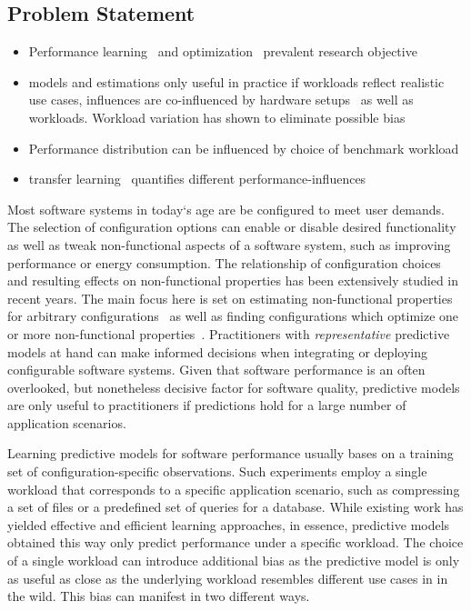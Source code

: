 \documentclass[conference]{IEEEtran}
\begin{document}
\subsection{Problem Statement}
\begin{itemize}
	\item Performance learning~\cite{siegmund_performance-influence_2015,haDeepPerf2019,guo__2013,guo_2018_data,sarkarCostEfficientSamplingPerformance,shu_adversarial_2020} and optimization~\cite{nairUsingBadLearners2017,nairFlash18,ohFindingNearoptimalConfigurations2017} prevalent research objective
	\item models and estimations only useful in practice if workloads reflect realistic use cases, influences are co-influenced by hardware setups~\cite{ding_bayesian_2020} as well as workloads. Workload variation has shown to eliminate possible bias~\cite{liao_2020_using_emse}
	\item Performance distribution can be influenced by choice of benchmark workload~\cite{alves_sampling_2020}
	\item transfer learning~\cite{jamishidi_transfer_2017,jamshidi_learning_2018,jamshidi_transfer_gp_2017,muehlbauer_identifying_2020} quantifies different performance-influences
\end{itemize}


Most software systems in today‘s age are be configured to meet user demands. The selection of configuration options can enable or disable desired functionality as well as tweak non-functional aspects of a software system, such as improving performance or energy consumption. The relationship of configuration choices and resulting effects on non-functional properties has been extensively studied in recent years. The main focus here is set on estimating non-functional properties for arbitrary configurations~\cite{siegmund_performance-influence_2015,haDeepPerf2019,guo__2013,guo_2018_data,sarkarCostEfficientSamplingPerformance} as well as finding configurations which optimize one or more non-functional properties~\cite{nairUsingBadLearners2017,nairFlash18,ohFindingNearoptimalConfigurations2017}. Practitioners with \emph{representative} predictive models at hand can make informed decisions when integrating or deploying configurable software systems. Given that software performance is an often overlooked, but nonetheless decisive factor for software quality, predictive models are only useful to practitioners if predictions hold for a large number of application scenarios.

Learning predictive models for software performance usually bases on a training set of configuration-specific observations. Such experiments employ a single workload that corresponds to a specific application scenario, such as compressing a set of files or a predefined set of queries for a database. While existing work has yielded effective and efficient learning approaches, in essence, predictive models obtained this way only predict performance under a specific workload.  The choice of a single workload can introduce additional bias as the predictive model is only as useful as close as the underlying workload resembles different use cases in in the wild. This bias can manifest in two different ways.
\end{document}

